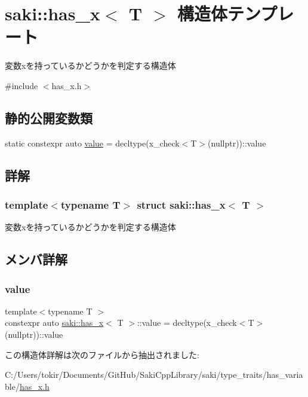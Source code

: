 \hypertarget{structsaki_1_1has__x}{}\section{saki\+:\+:has\+\_\+x$<$ T $>$ 構造体テンプレート}
\label{structsaki_1_1has__x}


変数xを持っているかどうかを判定する構造体  




{\ttfamily \#include $<$has\+\_\+x.\+h$>$}

\subsection*{静的公開変数類}
\begin{DoxyCompactItemize}
\item 
static constexpr auto \mbox{\hyperlink{structsaki_1_1has__x_aa3b89fa1981c7d31e7ec0c70ea01b451}{value}} = decltype(x\+\_\+check$<$T$>$(nullptr))\+::value
\end{DoxyCompactItemize}


\subsection{詳解}
\subsubsection*{template$<$typename T$>$\newline
struct saki\+::has\+\_\+x$<$ T $>$}

変数xを持っているかどうかを判定する構造体 

\subsection{メンバ詳解}
\mbox{\label{structsaki_1_1has__x_aa3b89fa1981c7d31e7ec0c70ea01b451}} 
\subsubsection{\texorpdfstring{value}{value}}
{\footnotesize\ttfamily template$<$typename T $>$ \\
constexpr auto \mbox{\hyperlink{structsaki_1_1has__x}{saki\+::has\+\_\+x}}$<$ T $>$\+::value = decltype(x\+\_\+check$<$T$>$(nullptr))\+::value\hspace{0.3cm}{\ttfamily [static]}}



この構造体詳解は次のファイルから抽出されました\+:\begin{DoxyCompactItemize}
\item 
C\+:/\+Users/tokir/\+Documents/\+Git\+Hub/\+Saki\+Cpp\+Library/saki/type\+\_\+traits/has\+\_\+variable/\mbox{\hyperlink{has__x_8h}{has\+\_\+x.\+h}}\end{DoxyCompactItemize}
